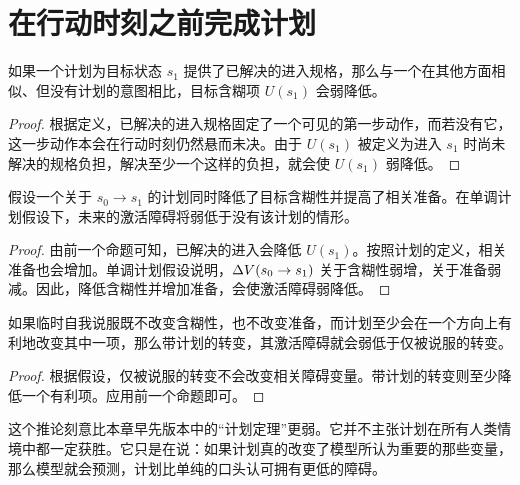 \section{在行动时刻之前完成计划}

\begin{proposition}[已解决的进入会降低含糊性]
如果一个计划为目标状态 $s_1$ 提供了已解决的进入规格，那么与一个在其他方面相似、但没有计划的意图相比，目标含糊项 $U(s_1)$ 会弱降低。
\end{proposition}

\begin{proof}
根据定义，已解决的进入规格固定了一个可见的第一步动作，而若没有它，这一步动作本会在行动时刻仍然悬而未决。由于 $U(s_1)$ 被定义为进入 $s_1$ 时尚未解决的规格负担，解决至少一个这样的负担，就会使 $U(s_1)$ 弱降低。
\end{proof}

\begin{proposition}
假设一个关于 $s_0 \to s_1$ 的计划同时降低了目标含糊性并提高了相关准备。在单调计划假设下，未来的激活障碍将弱低于没有该计划的情形。
\end{proposition}

\begin{proof}
由前一个命题可知，已解决的进入会降低 $U(s_1)$。按照计划的定义，相关准备也会增加。单调计划假设说明，$\Delta V(s_0 \to s_1)$ 关于含糊性弱增，关于准备弱减。因此，降低含糊性并增加准备，会使激活障碍弱降低。
\end{proof}

\begin{corollary}[临时自我说服在结构上更弱]
如果临时自我说服既不改变含糊性，也不改变准备，而计划至少会在一个方向上有利地改变其中一项，那么带计划的转变，其激活障碍就会弱低于仅被说服的转变。
\end{corollary}

\begin{proof}
根据假设，仅被说服的转变不会改变相关障碍变量。带计划的转变则至少降低一个有利项。应用前一个命题即可。
\end{proof}

\begin{remark}
这个推论刻意比本章早先版本中的“计划定理”更弱。它并不主张计划在所有人类情境中都一定获胜。它只是在说：如果计划真的改变了模型所认为重要的那些变量，那么模型就会预测，计划比单纯的口头认可拥有更低的障碍。
\end{remark}